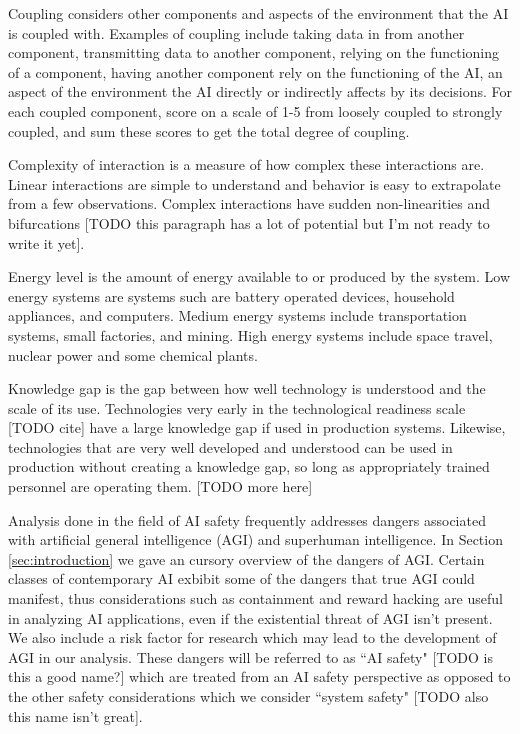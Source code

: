 \documentclass[11pt]{article}
\begin{document}
Coupling considers other components and aspects of the environment that the AI is coupled with.
Examples of coupling include taking data in from another component, transmitting data to another
component, relying on the functioning of a component, having another component rely on the
functioning of the AI, an aspect of the environment the AI directly or indirectly affects by its
decisions. For each coupled component, score on a scale of 1-5 from loosely coupled to strongly
coupled, and sum these scores to get the total degree of coupling.

Complexity of interaction is a measure of how complex these interactions are. Linear interactions
are simple to understand and behavior is easy to extrapolate from a few observations. Complex
interactions have sudden non-linearities and bifurcations [TODO this paragraph has a lot of potential
but I'm not ready to write it yet].

Energy level is the amount of energy available to or produced by the system. Low energy systems are
systems such are battery operated devices, household appliances, and computers. Medium energy
systems include transportation systems, small factories, and mining. High energy systems include
space travel, nuclear power and some chemical plants.

Knowledge gap is the gap between how well technology is understood and the scale of its use.
Technologies very early in the technological readiness scale [TODO cite] have a large knowledge gap
if used in production systems. Likewise, technologies that are very well developed and understood
can be used in production without creating a knowledge gap, so long as appropriately trained
personnel are operating them. [TODO more here]

Analysis done in the field of AI safety frequently addresses dangers associated with artificial
general intelligence (AGI) and superhuman intelligence. In Section \ref{sec:introduction} we gave an
cursory overview of the dangers of AGI. Certain classes of contemporary AI exbibit some of the
dangers that true AGI could manifest, thus considerations such as containment and reward hacking are
useful in analyzing AI applications, even if the existential threat of AGI isn't present.  We also
include a risk factor for research which may lead to the development of AGI in our analysis. These
dangers will be referred to as ``AI safety" [TODO is this a good name?] which are treated from an AI
safety perspective as opposed to the other safety considerations which we consider ``system safety"
[TODO also this name isn't great].
\end{document}
